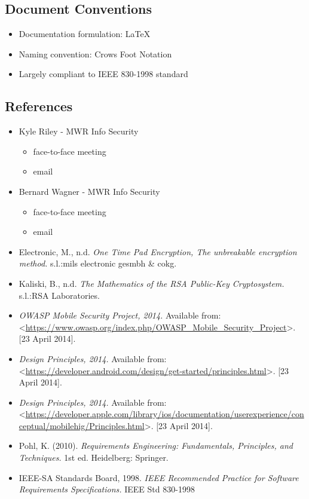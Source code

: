 \subsection{Document Conventions}
\begin{itemize}
\item Documentation formulation: LaTeX
\item Naming convention: Crows Foot Notation
\item Largely compliant to IEEE 830-1998 standard
\end{itemize}

\subsection{References}
\begin{itemize}
\item{Kyle Riley - MWR Info Security}
	\begin{itemize}
	\item face-to-face meeting
	\item email
	\end{itemize}

\item{Bernard Wagner - MWR Info Security}
	\begin{itemize}
	\item face-to-face meeting
	\item email
	\end{itemize}

\item{Electronic, M., n.d. \textit{One Time Pad Encryption, The unbreakable encryption method.} s.l.:mils electronic gesmbh \& cokg.}

\item{Kaliski, B., n.d. \textit{The Mathematics of the RSA Public-Key Cryptosystem.} s.l.:RSA Laboratories.}

\item{\textit{OWASP Mobile Security Project, 2014.} Available from: \textless\url{https://www.owasp.org/index.php/OWASP_Mobile_Security_Project}\textgreater. [23 April 2014].}

\item{\textit{Design Principles, 2014.} Available from:  \textless\url{https://developer.android.com/design/get-started/principles.html}\textgreater. [23 April 2014].}

\item{\textit{Design Principles, 2014.} Available from: \textless\url{https://developer.apple.com/library/ios/documentation/userexperience/conceptual/mobilehig/Principles.html}\textgreater. [23 April 2014].}

\item{Pohl, K. (2010). \textit{Requirements Engineering: Fundamentals, Principles, and Techniques.} 1st ed. Heidelberg: Springer.}

\item{IEEE-SA Standards Board, 1998. \textit{IEEE Recommended Practice for Software Requirements Specifications.} IEEE Std 830-1998}

\end{itemize}

